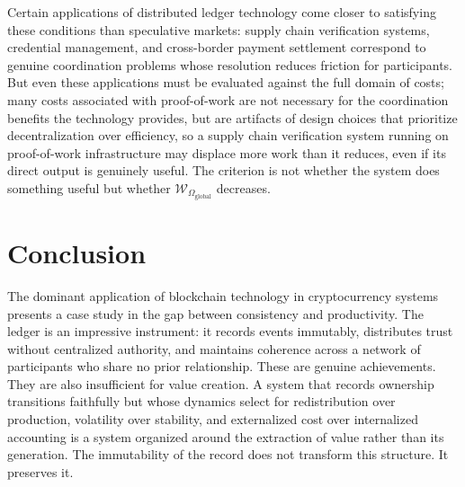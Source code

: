 Certain applications of distributed ledger technology come closer to satisfying these conditions than speculative markets: supply chain verification systems, credential management, and cross-border payment settlement correspond to genuine coordination problems whose resolution reduces friction for participants. But even these applications must be evaluated against the full domain of costs; many costs associated with proof-of-work are not necessary for the coordination benefits the technology provides, but are artifacts of design choices that prioritize decentralization over efficiency, so a supply chain verification system running on proof-of-work infrastructure may displace more work than it reduces, even if its direct output is genuinely useful. The criterion is not whether the system does something useful but whether $\mathcal{W}_{\Omega_{\mathrm{global}}}$ decreases.

\section{Conclusion}

The dominant application of blockchain technology in cryptocurrency systems presents a case study in the gap between consistency and productivity. The ledger is an impressive instrument: it records events immutably, distributes trust without centralized authority, and maintains coherence across a network of participants who share no prior relationship. These are genuine achievements. They are also insufficient for value creation. A system that records ownership transitions faithfully but whose dynamics select for redistribution over production, volatility over stability, and externalized cost over internalized accounting is a system organized around the extraction of value rather than its generation. The immutability of the record does not transform this structure. It preserves it.

